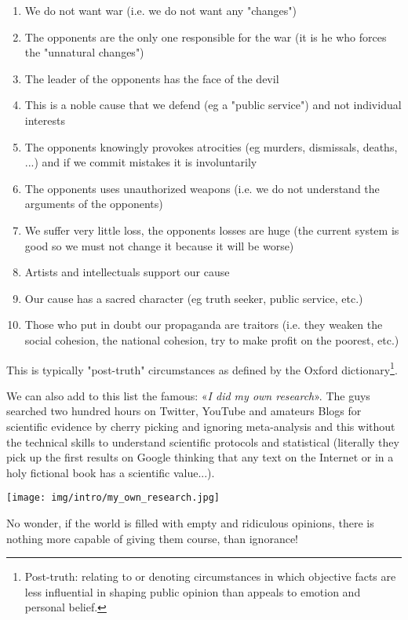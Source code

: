 	\begin{enumerate}
		\item We do not want war (i.e. we do not want any "changes")
		
		\item The opponents are the only one responsible for the war (it is he who forces the "unnatural changes")
		
		\item The leader of the opponents has the face of the devil
		
		\item This is a noble cause that we defend (eg a "public service") and not individual interests
		
		\item The opponents knowingly provokes atrocities (eg murders, dismissals, deaths, ...) and if we commit mistakes it is involuntarily
		
		\item The opponents uses unauthorized weapons (i.e. we do not understand the arguments of the opponents)
		
		\item We suffer very little loss, the opponents losses are huge (the current system is good so we must not change it because it will be worse)
		
		\item Artists and intellectuals support our cause
		
		\item Our cause has a sacred character (eg truth seeker, public service, etc.)
		
		\item Those who put in doubt our propaganda are traitors (i.e. they weaken the social cohesion, the national cohesion, try to make profit on the poorest, etc.)
	\end{enumerate}
	This is typically "post-truth" circumstances as defined by the Oxford dictionary\footnote{Post-truth: relating to or denoting circumstances in which objective facts are less influential in shaping public opinion than appeals to emotion and personal belief.}.
	
	We can also add to this list the famous: «\textit{I did my own research}». The guys searched two hundred hours on Twitter, YouTube and amateurs Blogs for scientific evidence by cherry picking and ignoring meta-analysis and this without the technical skills to understand scientific protocols and statistical (literally they pick up the first results on Google thinking that any text on the Internet or in a holy fictional book has a scientific value...).
	\begin{center}
		\texttt{[image: img/intro/my\_own\_research.jpg]}
	\end{center}
	No wonder, if the world is filled with empty and ridiculous opinions, there is nothing more capable of giving them course, than ignorance!
	
